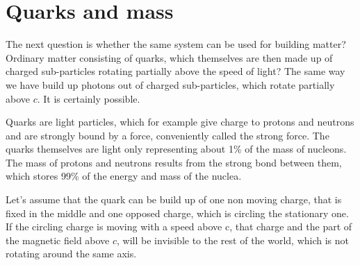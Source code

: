 \chapter{Quarks and mass}

The next question is whether the same system can be used for building matter? Ordinary matter consisting of quarks, which themselves are then made up of charged sub-particles rotating partially above the speed of light? The same way we have build up photons out of charged sub-particles, which rotate partially above $c$.    It is certainly possible. 

Quarks are light particles, which for example give charge to protons and neutrons and are strongly bound by a force, conveniently called the strong force. The quarks themselves are light only representing about 1\% of the mass of nucleons. The mass of protons and neutrons results from the strong bond between them, which stores 99\% of the energy and mass of the nuclea.

Let's assume that the quark can be build up of one non moving charge, that is fixed in the middle and one opposed charge, which is circling the stationary one. If the circling charge is moving with a speed above c, that charge and the part of the magnetic field above $c$, will be invisible to the rest of the world, which is not rotating around the same axis.

